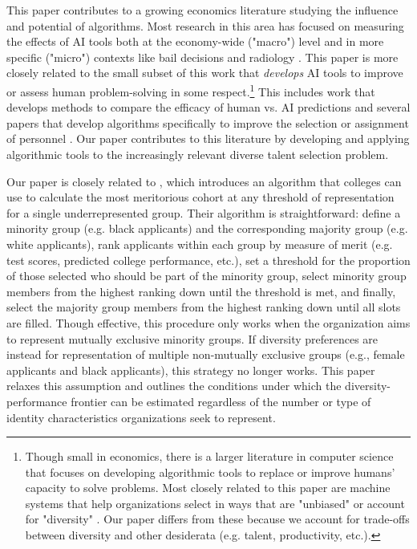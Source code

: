 This paper contributes to a growing economics literature studying the influence and potential of algorithms. Most research in this area has focused on measuring the effects of AI tools both at the economy-wide ("macro") level \cite{acemoglu2022automation,babina2024artificial,calvino2023portrait,zolas2021advanced,webb2019impact} and in more specific ("micro") contexts like bail decisions and radiology \cite{albright2023hidden,kleinberg2015prediction,stevenson2019algorithmic,angelova2023algorithmic,imai2023experimental,grimon2022impact,noy2023experimental,brynjolfsson2023generative,bundorf2019humans, mullainathan2019machine, ribers2020machine, agarwal2023combining}. This paper is more closely related to the small subset of this work that \emph{develops} AI tools to improve or assess human problem-solving in some respect.\footnote{Though small in economics, there is a larger literature in computer science that focuses on developing algorithmic tools to replace or improve humans' capacity to solve problems. Most closely related to this paper are machine systems that help organizations select in ways that are "unbiased" \cite{tambe2019artificial,raghavan2020mitigating} or account for "diversity" \cite{gillet2011diversity,huppenkothen2020entrofy}. Our paper differs from these because we account for trade-offs between diversity and other desiderata (e.g. talent, productivity, etc.).}  This includes work that develops methods to compare the efficacy of human vs. AI predictions \cite{kleinberg2018human,rambachan2024identifying} and several papers that develop algorithms specifically to improve the selection or assignment of personnel \cite{li2020hiring,bergman2021seven,kleinberg2018algorithmic,huppenkothen2020entrofy}. Our paper contributes to this literature by developing and applying algorithmic tools to the increasingly relevant diverse talent selection problem. 

Our paper is closely related to \textcite{kleinberg2018algorithmic}, which introduces an algorithm that colleges can use to calculate the most meritorious cohort at any threshold of representation for a single underrepresented group. Their algorithm is straightforward: define a minority group (e.g. black applicants) and the corresponding majority group (e.g. white applicants), rank applicants within each group by measure of merit (e.g. test scores, predicted college performance, etc.), set a threshold for the proportion of those selected who should be part of the minority group, select minority group members from the highest ranking down until the threshold is met, and finally, select the majority group members from the highest ranking down until all slots are filled. Though effective, this procedure only works when the organization aims to represent mutually exclusive minority groups. If diversity preferences are instead for representation of multiple non-mutually exclusive groups (e.g., female applicants and black applicants), this strategy no longer works. This paper relaxes this assumption and outlines the conditions under which the diversity-performance frontier can be estimated regardless of the number or type of identity characteristics organizations seek to represent.


